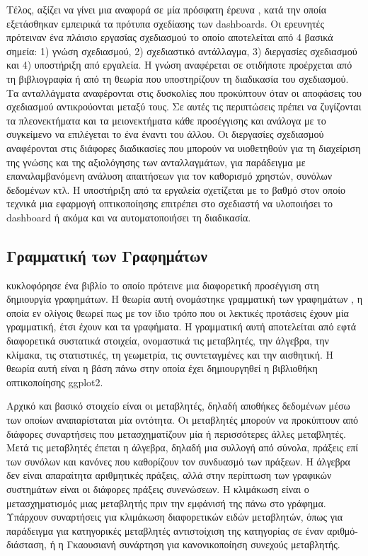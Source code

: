 \documentclass[greek, 12pt]{article}
\begin{document}
Τέλος, αξίζει να γίνει μια αναφορά σε μία πρόσφατη έρευνα \cite{bach2022dashboard}, κατά την οποία εξετάσθηκαν εμπειρικά τα πρότυπα σχεδίασης των dashboards. Οι ερευνητές πρότειναν ένα πλάισιο εργασίας σχεδιασμού το οποίο αποτελείται από 4 βασικά σημεία: 1) γνώση σχεδιασμού, 2) σχεδιαστικό αντάλλαγμα, 3) διεργασίες σχεδιασμού και 4) υποστήριξη από εργαλεία. Η γνώση αναφέρεται σε οτιδήποτε προέρχεται από τη βιβλιογραφία ή από τη θεωρία που υποστηρίζουν τη διαδικασία του σχεδιασμού. Τα ανταλλάγματα αναφέρονται στις δυσκολίες που προκύπτουν όταν οι αποφάσεις του σχεδιασμού αντικρούονται μεταξύ τους. Σε αυτές τις περιπτώσεις πρέπει να ζυγίζονται τα πλεονεκτήματα και τα μειονεκτήματα κάθε προσέγγισης και ανάλογα με το συγκείμενο να επιλέγεται το ένα έναντι του άλλου. Οι διεργασίες σχεδιασμού αναφέρονται στις διάφορες διαδικασίες που μπορούν να υιοθετηθούν για τη διαχείριση της γνώσης και της αξιολόγησης των ανταλλαγμάτων, για παράδειγμα με επαναλαμβανόμενη ανάλυση απαιτήσεων για τον καθορισμό χρηστών, συνόλων δεδομένων κτλ. Η υποστήριξη από τα εργαλεία σχετίζεται με το βαθμό στον οποίο τεχνικά μια εφαρμογή οπτικοποίησης επιτρέπει στο σχεδιαστή να υλοποιήσει το dashboard ή ακόμα και να αυτοματοποιήσει τη διαδικασία.

\subsection{Γραμματική των Γραφημάτων}

 κυκλοφόρησε ένα βιβλίο το οποίο πρότεινε μια διαφορετική προσέγγιση στη δημιουργία γραφημάτων. Η θεωρία αυτή ονομάστηκε γραμματική των γραφημάτων \cite{wilkinson2012grammar}, η οποία εν ολίγοις θεωρεί πως με τον ίδιο τρόπο που οι λεκτικές προτάσεις έχουν μία γραμματική, έτσι έχουν και τα γραφήματα. Η γραμματική αυτή αποτελείται από εφτά διαφορετικά συστατικά στοιχεία, ονομαστικά τις μεταβλητές, την άλγεβρα, την κλίμακα, τις στατιστικές, τη γεωμετρία, τις συντεταγμένες και την αισθητική. Η θεωρία αυτή είναι η βάση πάνω στην οποία έχει δημιουργηθεί η βιβλιοθήκη οπτικοποίησης ggplot2.

Αρχικό και βασικό στοιχείο είναι οι μεταβλητές, δηλαδή αποθήκες δεδομένων μέσω των οποίων αναπαρίσταται μία οντότητα. Οι μεταβλητές μπορούν να προκύπτουν από διάφορες συναρτήσεις που μετασχηματίζουν μία ή περισσότερες άλλες μεταβλητές. Μετά τις μεταβλητές έπεται η άλγεβρα, δηλαδή μια συλλογή από σύνολα, πράξεις επί των συνόλων και κανόνες που καθορίζουν τον συνδυασμό των πράξεων. Η άλγεβρα δεν είναι απαραίτητα αριθμητικές πράξεις, αλλά στην περίπτωση των γραφικών συστημάτων είναι οι διάφορες πράξεις συνενώσεων. Η κλιμάκωση είναι ο μετασχηματισμός μιας μεταβλητής πριν την εμφάνισή της πάνω στο γράφημα. Υπάρχουν συναρτήσεις για κλιμάκωση διαφορετικών ειδών μεταβλητών, όπως για παράδειγμα για κατηγορικές μεταβλητές αντιστοίχιση της κατηγορίας σε έναν αριθμό-διάσταση, ή η Γκαουσιανή συνάρτηση για κανονικοποίηση συνεχούς μεταβλητής.
\end{document}

